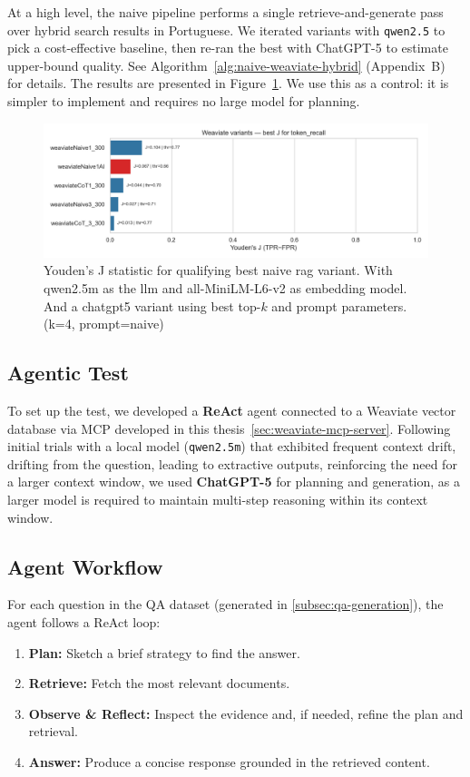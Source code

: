 At a high level, the naive pipeline performs a single retrieve-and-generate pass over hybrid search results in Portuguese. We iterated variants with \texttt{qwen2.5} to pick a cost-effective baseline, then re-ran the best with ChatGPT-5 to estimate upper-bound quality. See Algorithm~\ref{alg:naive-weaviate-hybrid} (Appendix~B) for details.
The results are presented in Figure~\ref{fig:weaviate_test}.
We use this as a control: it is simpler to implement and requires no large model for planning.
\begin{figure}
    \centering
    \includegraphics[width=1\linewidth]{Figures/10_weaviate_best_j_token_recall.png}
    \caption{Youden's J statistic for qualifying best naive rag variant. With qwen2.5m as the llm and all-MiniLM-L6-v2 as embedding model. And a chatgpt5 variant using best top-$k$ and prompt parameters.(k=4, prompt=naive)}
    \label{fig:weaviate_test}
\end{figure}
\subsection{Agentic Test}
\label{sec:agentic-test}

To set up the test, we developed a \textbf{ReAct} agent connected to a Weaviate vector database via \gls{MCP} developed in this thesis~\ref{sec:weaviate-mcp-server}.  Following initial trials with a local model (\texttt{qwen2.5m}) that exhibited frequent context drift, drifting from the question, leading to extractive outputs, reinforcing the need for a larger context window, we used \textbf{ChatGPT-5} for planning and generation, as a larger model is required to maintain multi-step reasoning within its context window.

\subsection{Agent Workflow}
For each question in the QA dataset (generated in \ref{subsec:qa-generation}), the agent follows a ReAct loop:
\begin{enumerate}
\item \textbf{Plan:} Sketch a brief strategy to find the answer.
\item \textbf{Retrieve:} Fetch the most relevant documents.
\item \textbf{Observe \& Reflect:} Inspect the evidence and, if needed, refine the plan and retrieval.
\item \textbf{Answer:} Produce a concise response grounded in the retrieved content.
\end{enumerate}

